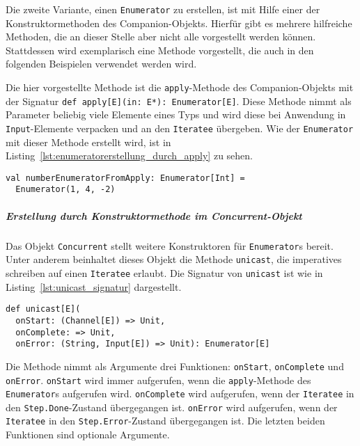 \documentclass[draft=false
              ,paper=a4
              ,twoside=false
              ,fontsize=11pt
              ,headsepline
              ,BCOR10mm
              ,DIV11
              ]{scrbook}
\begin{document}
Die zweite Variante, einen \lstinline|Enumerator| zu erstellen, ist mit Hilfe einer der Konstruktormethoden des Companion-Objekts.
Hierfür gibt es mehrere hilfreiche Methoden, die an dieser Stelle aber nicht alle vorgestellt werden können.
Stattdessen wird exemplarisch eine Methode vorgestellt, die auch in den folgenden Beispielen verwendet werden wird.

Die hier vorgestellte Methode ist die \lstinline|apply|-Methode des Companion-Objekts mit der Signatur \lstinline[breaklines=true]|def apply[E](in: E*): Enumerator[E]|.
Diese Methode nimmt als Parameter beliebig viele Elemente eines Typs und wird diese bei Anwendung in \lstinline|Input|-Elemente verpacken und an den \lstinline|Iteratee| übergeben.
Wie der \lstinline|Enumerator| mit dieser Methode erstellt wird, ist in Listing~\ref{lst:enumeratorerstellung_durch_apply} zu sehen.

\begin{lstlisting}[caption=Erstellung eines Enumerators durch die apply-Konstruktormethode, label=lst:enumeratorerstellung_durch_apply]
val numberEnumeratorFromApply: Enumerator[Int] =
  Enumerator(1, 4, -2)
\end{lstlisting}


\subparagraph{Erstellung durch Konstruktormethode im Concurrent-Objekt} %
\label{subp:erstellung_durch_konstruktormethode_im_concurrent_objekt}\mbox{} %

Das Objekt \lstinline|Concurrent| stellt weitere Konstruktoren für \lstinline|Enumerator|s bereit.
Unter anderem beinhaltet dieses Objekt die Methode \lstinline|unicast|, die imperatives schreiben auf einen \lstinline|Iteratee| erlaubt.
Die Signatur von \lstinline|unicast| ist wie in Listing~\ref{lst:unicast_signatur} dargestellt.

\begin{lstlisting}[caption=Die Signatur von Concurrent.unicast, label=lst:unicast_signatur]
def unicast[E](
  onStart: (Channel[E]) => Unit,
  onComplete: => Unit,
  onError: (String, Input[E]) => Unit): Enumerator[E]
\end{lstlisting}

Die Methode nimmt als Argumente drei Funktionen: \lstinline|onStart|, \lstinline|onComplete| und \lstinline|onError|.
\lstinline|onStart| wird immer aufgerufen, wenn die \lstinline|apply|-Methode des \lstinline|Enumerator|s aufgerufen wird.
\lstinline|onComplete| wird aufgerufen, wenn der \lstinline|Iteratee| in den \lstinline|Step.Done|-Zustand übergegangen ist.
\lstinline|onError| wird aufgerufen, wenn der \lstinline|Iteratee| in den \lstinline|Step.Error|-Zustand übergegangen ist.
Die letzten beiden Funktionen sind optionale Argumente.
\end{document}
